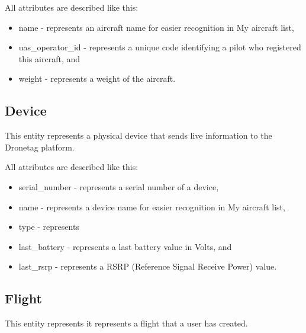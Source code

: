 All attributes are described like this:
\begin{itemize}
    \item name - represents an aircraft name for easier recognition in My aircraft list,
    \item uas\_operator\_id - represents a unique code identifying a pilot who registered this aircraft, and
    \item weight - represents a weight of the aircraft.
\end{itemize}

\subsection{Device}\label{subsec:device}
This entity represents a physical device that sends live information to the Dronetag platform.

All attributes are described like this:
\begin{itemize}
    \item serial\_number - represents a serial number of a device,
    \item name - represents a device name for easier recognition in My aircraft list,
    \item type - represents
    \item last\_battery - represents a last battery value in Volts, and
    \item last\_rsrp - represents a RSRP (Reference Signal Receive Power) value.
\end{itemize}

\subsection{Flight}\label{subsec:flight}
This entity represents it represents a flight that a user has created.

